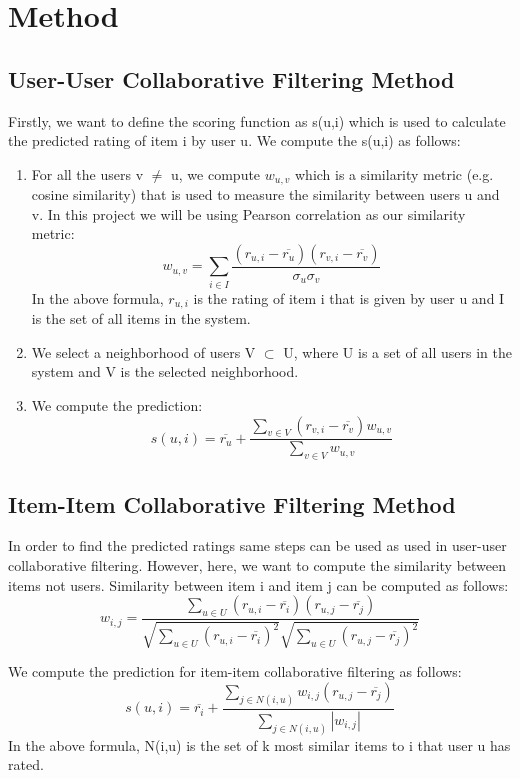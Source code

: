 \documentclass[12pt,a4paper]{report}
\begin{document}
\chapter{Method}
\section{User-User Collaborative Filtering Method}

Firstly, we want to define the scoring function as s(u,i) which is used to calculate the predicted rating of item i by user u. We compute the s(u,i) as follows:
\vspace{-5mm}
\begin{enumerate}
    \item For all the users v $\neq$ u, we compute $w_{u,v}$ which is a similarity metric (e.g. cosine similarity) that is used to measure the similarity between users u and v. In this project we will be using Pearson correlation as our similarity metric:
    $$w_{u,v} = \sum_{i\in I} \frac{(r_{u,i}-\overline{r_u})(r_{v,i}-\overline{r_v})}
    {\sigma_u\sigma_v}$$
    In the above formula, $r_{u,i}$ is the rating of item i that is given by user u and I is the set of all items in the system.
    \item We select a neighborhood of users V $\subset$ U, where U is a set of all users in the system and V is the selected neighborhood.
    \item We compute the prediction:
    $$s(u,i) = \overline{r_u} +
    \frac{\sum_{v \in V}(r_{v,i}-\overline{r_v})w_{u,v}}
    {\sum_{v \in V}w_{u,v}} $$
\end{enumerate}

\section{Item-Item Collaborative Filtering Method}
In order to find the predicted ratings same steps can be used as used in user-user collaborative filtering. However, here, we want to compute the similarity between items not users. Similarity between item i and item j can be computed as follows:
$$w_{i,j} = \frac{\sum_{u \in U} (r_{u,i}-\overline{r_i})(r_{u,j}-\overline{r_j}) }{\sqrt{\sum_{u \in U}(r_{u,i}-\overline{r_i})^2}
\sqrt{\sum_{u \in U}(r_{u,j}-\overline{r_j})^2}}$$

We compute the prediction for item-item collaborative filtering as follows:
$$s(u,i) = \overline{r_i} + \frac{\sum_{j \in N(i,u)} w_{i,j} (r_{u,j}-\overline{r_j})}{\sum_{j \in N(i,u)}|w_{i,j}|}$$
In the above formula, N(i,u) is the set of k most similar items to i that user u has rated.
\end{document}
